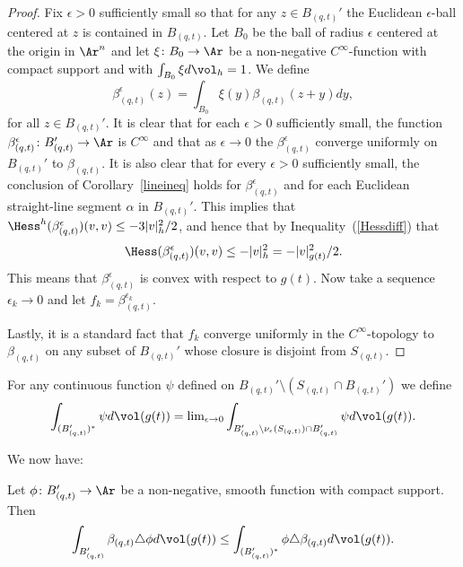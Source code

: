 \begin{proof}\sketch
{}
Fix $\epsilon>0$ sufficiently small so that for any $z\in
B_{(q,t)}'$ the Euclidean $\epsilon$-ball centered at $z$ is
contained in $B_{(q,t)}$. Let $B_0$ be the ball of radius $\epsilon$
centered at the origin in $\Ar^n$ and let $\xi\colon B_0\to \Ar$ be
a non-negative $C^\infty$-function with compact support and with
$\int_{B_0}\xi d\vol_h=1$. We define
$$\beta_{(q,t)}^\epsilon(z)=\int_{B_0}\xi(y)\beta_{(q,t)}(z+y)dy,$$
for all $z\in B_{(q,t)}'$. It is clear that for each $\epsilon>0$
sufficiently small, the function $\beta_{(q,t)}^\epsilon\colon
B_{(q,t)}'\to \Ar$ is $C^\infty$ and that as $\epsilon\rightarrow 0$
the $\beta_{(q,t)}^\epsilon$ converge uniformly on $B_{(q,t)}'$ to
$\beta_{(q,t)}$. It is also clear that for every $\epsilon>0$
sufficiently small, the conclusion of Corollary~\ref{lineineq} holds
for $\beta_{(q,t)}^\epsilon$ and for each Euclidean straight-line
segment $\alpha$ in $B_{(q,t)}'$. This implies that $\Hess^h(\beta_{(q,t)}^\epsilon)(v,v)\le -3|v|_h^2/2$, and hence that
by Inequality~(\ref{Hessdiff}) that
$$\Hess(\beta_{(q,t)}^\epsilon)(v,v)\le -|v|^2_h=-|v|^2_{g(t)}/2.$$
This means that $\beta_{(q,t)}^\epsilon$ is convex with respect to
$g(t)$. Now take a sequence $\epsilon_k\rightarrow 0$ and let
$f_k=\beta_{(q,t)}^{\epsilon_k}$.

Lastly, it is a standard fact that $f_k$ converge uniformly in the
$C^\infty$-topology to $\beta_{(q,t)}$ on any subset of $B_{(q,t)}'$
whose closure is disjoint from $S_{(q,t)}$.
\end{proof}

\begin{definition}
\label{def:starred-integral}
For any continuous function $\psi$ defined on $B_{(q,t)}'\setminus
\left(S_{(q,t)}\cap B_{(q,t)}'\right)$ we define
$$\int_{(B_{(q,t)}')^*}\psi d\vol(g(t))=\mathrm{lim}_{\epsilon\rightarrow
0}\int_{B_{(q,t)}'\setminus \nu_\epsilon(S_{(q,t)})\cap
B_{(q,t)}'}\psi d\vol(g(t)).$$
\end{definition}

We now have:

\begin{claim}
\label{claim:beta-weak-laplacian-inequality}
\label{wineq}
Let $\phi\colon B_{(q,t)}'\to \Ar$ be a non-negative, smooth
function with compact support. Then
$$\int_{B_{(q,t)}'}\beta_{(q,t)}\triangle \phi d\vol(g(t))\le \int_{(B_{(q,t)}')^*}\phi
\triangle \beta_{(q,t)} d\vol(g(t)).$$
\end{claim}


